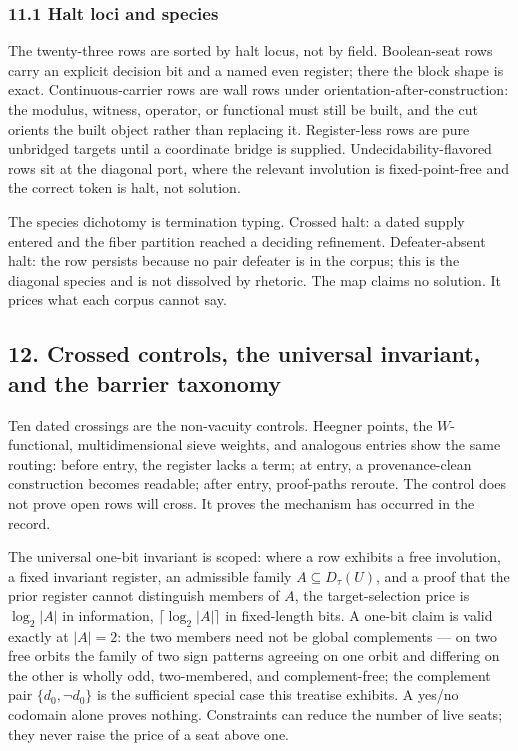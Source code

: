 \documentclass[10pt]{article}
\renewcommand{\_}{\origunderscore\allowbreak}
\begin{document}
\hypertarget{halt-loci-and-species}{%
\subsubsection{11.1 Halt loci and species}\label{halt-loci-and-species}}

The twenty-three rows are sorted by halt locus, not by field.
Boolean-seat rows carry an explicit decision bit and a named even
register; there the block shape is exact. Continuous-carrier rows are
wall rows under orientation-after-construction: the modulus, witness,
operator, or functional must still be built, and the cut orients the
built object rather than replacing it. Register-less rows are pure
unbridged targets until a coordinate bridge is supplied.
Undecidability-flavored rows sit at the diagonal port, where the
relevant involution is fixed-point-free and the correct token is halt,
not solution.

The species dichotomy is termination typing. Crossed halt: a dated
supply entered and the fiber partition reached a deciding refinement.
Defeater-absent halt: the row persists because no pair defeater is in
the corpus; this is the diagonal species and is not dissolved by
rhetoric. The map claims no solution. It prices what each corpus cannot
say.

\hypertarget{crossed-controls-the-universal-invariant-and-the-barrier-taxonomy}{%
\subsection{12. Crossed controls, the universal invariant, and the
barrier
taxonomy}\label{crossed-controls-the-universal-invariant-and-the-barrier-taxonomy}}

Ten dated crossings are the non-vacuity controls. Heegner points, the
\(W\)-functional, multidimensional sieve weights, and analogous entries
show the same routing: before entry, the register lacks a term; at
entry, a provenance-clean construction becomes readable; after entry,
proof-paths reroute. The control does not prove open rows will cross. It
proves the mechanism has occurred in the record.

The universal one-bit invariant is scoped: where a row exhibits a free
involution, a fixed invariant register, an admissible family
\(A\subseteq D_\tau(U)\), and a proof that the prior register cannot
distinguish members of \(A\), the target-selection price is
\(\log_2|A|\) in information, \(\lceil\log_2|A|\rceil\) in fixed-length
bits. A one-bit claim is valid exactly at \(|A| = 2\): the two members
need not be global complements --- on two free orbits the family of two
sign patterns agreeing on one orbit and differing on the other is wholly
odd, two-membered, and complement-free; the complement pair
\(\{d_0, \neg d_0\}\) is the sufficient special case this treatise
exhibits. A yes/no codomain alone proves nothing. Constraints can reduce
the number of live seats; they never raise the price of a seat above
one.
\end{document}
